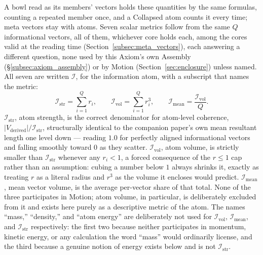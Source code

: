 \documentclass[12pt, a4paper]{article}
\begin{document}
A bowl read as its members' vectors holds these quantities by the same formulas, counting a repeated member once, and a Collapsed atom counts it every time; meta vectors stay with atoms.
Seven scalar metrics follow from the same $Q$ informational vectors, all of them, whichever core holds each, among the cores valid at the reading time (Section~\ref{subsec:meta_vectors}),
each answering a different question, none used by this Axiom's own
Assembly (\S\ref{subsec:axiom_assembly}) or by Motion
(Section~\ref{sec:enclosure}) unless named. All seven are written $\mathcal{I}$, for the information atom, with a subscript that names the metric:
\[
\mathcal{I}_{\mathrm{str}} = \sum_{i=1}^Q r_i, \qquad
\mathcal{I}_{\mathrm{vol}} = \sum_{i=1}^Q r_i^3, \qquad
\mathcal{I}_{\mathrm{mean}} = \frac{\mathcal{I}_{\mathrm{vol}}}{Q}.
\]
$\mathcal{I}_{\mathrm{str}}$, atom strength, is the correct denominator for
atom-level coherence, $\lvert V_{\text{derived}}\rvert /
\mathcal{I}_{\mathrm{str}}$, structurally identical to the companion paper's own
mean resultant length one level down --- reading $1.0$ for perfectly
aligned informational vectors and falling smoothly toward $0$ as they
scatter. $\mathcal{I}_{\mathrm{vol}}$, atom volume, is strictly
smaller than $\mathcal{I}_{\mathrm{str}}$ whenever any $r_i<1$, a forced
consequence of the $r\le 1$ cap rather than an assumption: cubing a
number below $1$ always shrinks it, exactly as treating $r$ as a
literal radius and $r^3$ as the volume it encloses would predict.
$\mathcal{I}_{\mathrm{mean}}$, mean vector volume, is the average per-vector
share of that total. None of the three participates in Motion; atom
volume, in particular, is deliberately excluded from it and exists
here purely as a descriptive metric of the atom. The names ``mass,''
``density,'' and ``atom energy'' are deliberately not used for
$\mathcal{I}_{\mathrm{vol}}$, $\mathcal{I}_{\mathrm{mean}}$, and
$\mathcal{I}_{\mathrm{str}}$ respectively: the first two because neither
participates in momentum, kinetic energy, or any calculation the word
``mass'' would ordinarily license, and the third because a genuine
notion of energy exists below and is not $\mathcal{I}_{\mathrm{str}}$.
\end{document}
